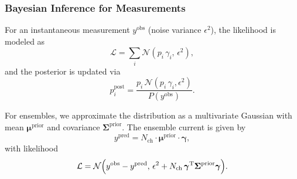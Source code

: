 \documentclass[pdflatex,sn-mathphys-num]{sn-jnl}%
\theoremstyle{thmstyleone}%
\theoremstyle{thmstyletwo}%
\theoremstyle{thmstylethree}%
\begin{document}
\subsubsection{Bayesian Inference for Measurements}
For an instantaneous measurement \(y^{\text{obs}}\) (noise variance \(\epsilon^2\)), the likelihood is modeled as
\begin{equation}
	\mathcal{L} = \sum_i \mathcal{N}(p_i\,\gamma_i,\,\epsilon^2),
	\label{eq:inst_likelihood_unified}
\end{equation}
and the posterior is updated via
\begin{equation}
	p_i^{\text{post}} = \frac{p_i\, \mathcal{N}(p_i\,\gamma_i,\epsilon^2)}{P(y^{\text{obs}})}.
	\label{eq:inst_posterior_unified}
\end{equation}

For ensembles, we approximate the distribution as a multivariate Gaussian with mean \(\boldsymbol{\mu}^{\text{prior}}\) and covariance \(\boldsymbol{\Sigma}^{\text{prior}}\). The ensemble current is given by
\begin{equation}
	y^{\text{pred}} = N_{\text{ch}} \cdot \boldsymbol{\mu}^{\text{prior}} \cdot \boldsymbol{\gamma},
	\label{eq:ensemble_current_unified}
\end{equation}
with likelihood
\begin{equation}
	\mathcal{L} = \mathcal{N}\Bigl(y^{\text{obs}} - y^{\text{pred}},\, \epsilon^2 + N_{\text{ch}}\,\boldsymbol{\gamma}^{\mathrm{T}}\boldsymbol{\Sigma}^{\text{prior}}\boldsymbol{\gamma}\Bigr).
	\label{eq:ensemble_likelihood_unified}
\end{equation}
\end{document}

